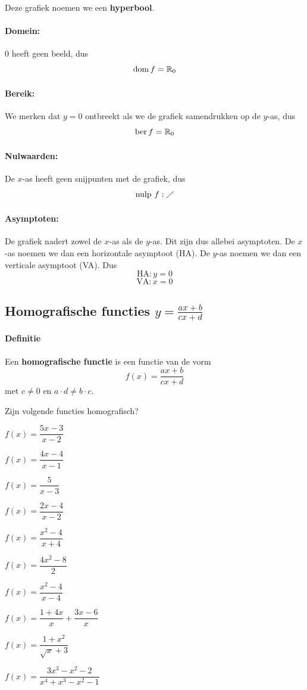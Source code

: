\documentclass[a4paper,12pt]{article}
\begin{document}
Deze grafiek noemen we een {\bf hyperbool}.

\paragraph{Domein:}
0 heeft geen beeld, dus
$$\dom f = \mathbb{R}_0$$

\paragraph{Bereik:}
We merken dat $y=0$ ontbreekt als we de grafiek samendrukken op de $y$-as, dus
$$\ber f = \mathbb{R}_0$$
\paragraph{Nulwaarden:}
De $x$-as heeft geen snijpunten met de grafiek, dus
$$\mbox{nulp } f: \diagup$$

\paragraph{Asymptoten:}
De grafiek nadert zowel de $x$-as als de $y$-as. Dit zijn dus allebei asymptoten. De $x$-as noemen we dan een horizontale asymptoot (HA). De $y$-as noemen we dan een verticale asymptoot (VA). Dus
$$\text{HA}: y=0$$
$$\text{VA}: x=0$$

\subsection{Homografische functies $y=\frac{ax+b}{cx+d}$}

\paragraph*{Definitie}
\begin{mdframed}
Een {\bf homografische functie} is een functie van de vorm
$$f(x)=\dfrac{ax+b}{cx+d}$$
met $c\neq 0$ en $a\cdot d\neq b\cdot c$.
\end{mdframed}

\begin{oefening}
Zijn volgende functies homografisch?
\begin{exlist}{2}
  \item $f(x)=\dfrac{5x-3}{x-2}$
  \item $f(x)=\dfrac{4x-4}{x-1}$
  \item $f(x)=\dfrac{5}{x-3}$
  \item $f(x)=\dfrac{2x-4}{x-2}$
  \item $f(x)=\dfrac{x^2-4}{x+4}$
  \item $f(x)=\dfrac{4x^2-8}{2}$
  \item $f(x)=\dfrac{x^2-4}{x-4}$
  \item $f(x)=\dfrac{1+4x}{x}+\dfrac{3x-6}{x}$
  \item $f(x)=\dfrac{1+x^2}{\sqrt{x}+3}$
  \item $f(x)=\dfrac{3x^3-x^2-2}{x^4+x^3-x^2-1}$
\end{exlist}
\end{oefening}
\end{document}
